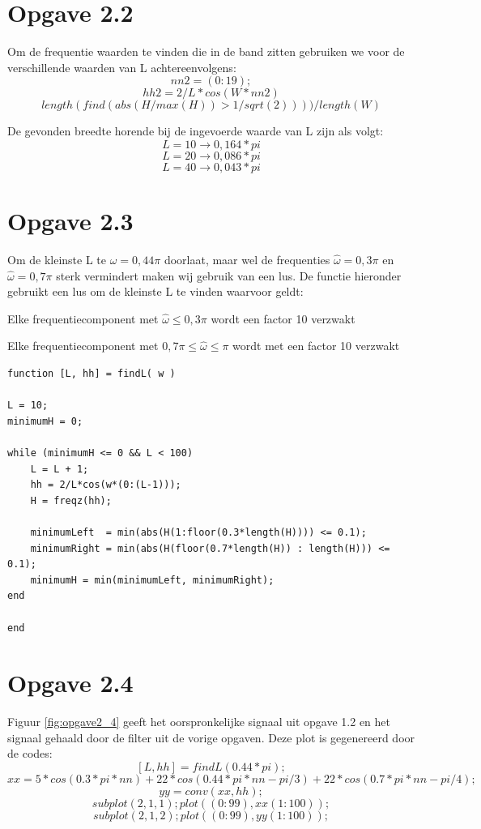 \documentclass{article}
\begin{document}
\section{Opgave 2.2}

Om de frequentie waarden te vinden die in de band zitten gebruiken we voor de verschillende waarden van L achtereenvolgens:
$$nn2 = (0:19);$$
$$hh2 = 2/L* cos(W*nn2)$$
$$length(find(abs(H/max(H)) > 1/sqrt(2)))) / length(W)$$

De gevonden breedte horende bij de ingevoerde waarde van L zijn als volgt:
$$L=10 \rightarrow 0,164*pi$$
$$L=20 \rightarrow 0,086*pi$$
$$L=40 \rightarrow 0,043*pi$$


\section{Opgave 2.3}
Om de kleinste L te $\hat{\omega} = 0,44\pi$ doorlaat, maar wel de frequenties $\hat{\omega} = 0,3\pi$ en $\hat{\omega} = 0,7\pi$ sterk vermindert maken wij gebruik van een lus. De functie hieronder gebruikt een lus om de kleinste L te vinden waarvoor geldt:

\begin{list}{}{}
 \item Elke frequentiecomponent met $\hat{\omega} \leq 0,3 \pi$ wordt een factor 10 verzwakt
 \item Elke frequentiecomponent met $0,7 \pi \leq \hat{\omega} \leq \pi$ wordt met een factor 10 verzwakt
\end{list}


\begin{lstlisting}
function [L, hh] = findL( w )

L = 10;
minimumH = 0;

while (minimumH <= 0 && L < 100)
    L = L + 1;
    hh = 2/L*cos(w*(0:(L-1))); 
    H = freqz(hh);
    
    minimumLeft  = min(abs(H(1:floor(0.3*length(H)))) <= 0.1);
    minimumRight = min(abs(H(floor(0.7*length(H)) : length(H))) <= 0.1);
    minimumH = min(minimumLeft, minimumRight);
end

end
\end{lstlisting}

\section{Opgave 2.4}

Figuur \ref{fig:opgave2_4} geeft het oorspronkelijke signaal uit opgave 1.2 en het signaal gehaald door de filter uit de vorige opgaven. Deze plot is gegenereerd door de codes:
$$[L, hh] = findL(0.44*pi);$$
$$xx = 5*cos(0.3*pi*nn) + 22 * cos(0.44*pi*nn - pi/3) + 22 * cos (0.7*pi*nn - pi/4);$$
$$yy = conv(xx, hh);$$
$$subplot(2,1,1); plot((0:99), xx(1:100));$$
$$subplot(2,1,2); plot((0:99), yy(1:100));$$
\end{document}
